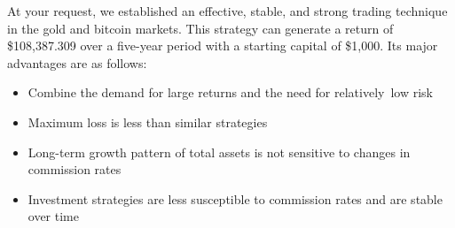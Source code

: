 \documentclass{mcmthesis}
\begin{document}
\newpage %
\begin{memo}
At your request, we established an effective, stable, and strong trading technique in the gold and bitcoin markets. This strategy can generate a return of \$108,387.309 over a five-year period with a starting capital of \$1,000. Its major advantages are as follows:
\begin{itemize}
	\item  Combine the demand for large returns and the need for relatively low risk
	\item  Maximum loss is less than similar strategies
	\item  Long-term growth pattern of total assets is not sensitive to changes in commission rates
	\item  Investment strategies are less susceptible to commission rates and are stable over time
\end{itemize}
	

\end{memo}
\end{document}
